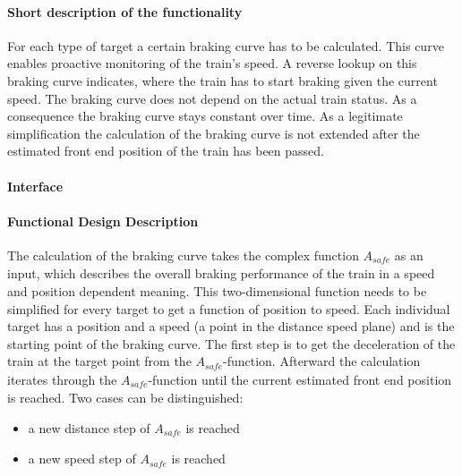 \paragraph{Short description of the functionality}
For each type of target a certain braking curve has to be calculated. This curve enables proactive monitoring of the train's speed. A reverse lookup on this braking curve indicates, where the train has to start braking given the current speed. The braking curve does not depend on the actual train status. As a consequence the braking curve stays constant over time. As a legitimate simplification the calculation of the braking curve is not extended after the estimated front end position of the train has been passed.

\paragraph{Interface}

\paragraph{Functional Design Description}
The calculation of the braking curve takes the complex function $A_{\mathit{safe}}$ as an input, which describes the overall braking performance of the train in a speed and position dependent meaning. This two-dimensional function needs to be simplified for every target to get a function of position to speed. Each individual target has a position and a speed (a point in the distance speed plane) and is the starting point of the braking curve. The first step is to get the deceleration of the train at the target point from the $A_{\mathit{safe}}$-function. Afterward the calculation iterates through the $A_{\mathit{safe}}$-function until the current estimated front end position is reached. Two cases can be distinguished:

\begin{itemize}
\item a new distance step of $A_{\mathit{safe}}$ is reached
\item a new speed step of $A_{\mathit{safe}}$ is reached
\end{itemize}

